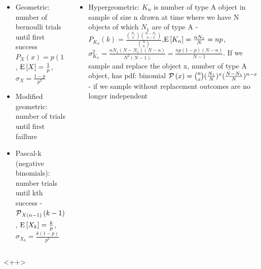 \documentclass[asd-beamer.tex]{subfiles}%
\begin{document}
\begin{frame}{}
    \begin{columns}[T]
        \begin{column}{0.5\textwidth}
            \begin{itemize}
                \item Geometric: number of bernoulli trials until first success $P_X(x)=p(1-p)^{x-1}$, $\operatorname{E}{[X]}=\frac{1}{p}$, $\sigma_X=\frac{1-p}{p^2}$
                \item Modified geometric: number of trials until first faillure
                \item Pascal-k (negative binomials): number trials until kth success - $\operatorname{\mathcal{P}}_{X(n-1)}{(k-1)}=\binom{n-1}(k-1)p^{k-1}(1-p)^{n-k}$, $\operatorname{E}{[X_k]}=\frac{k}{p}$, $\sigma_{X_k}=\frac{k(1-p)}{p^2}$
            \end{itemize}
        \end{column}
        \begin{column}{0.5\textwidth}
            \begin{itemize}
                \item Hypergeometric: $K_n$ is number of type A object in sample of size n drawn at time where we have N objects of which $N_1$ are of type A - $P_{K_n}(k)=\frac{\binom{N_1}{k}\binom{N-N_1}{n-k}}{\binom{N}{n}}$,$\operatorname{E}{[K_n]}=\frac{nN_1}{N}=np$, $\sigma_{K_n}^2=\frac{nN_1(N-N_1)(N-n)}{N^2(N-1)}=\frac{np(1-p)(N-n)}{N-1}$. If we sample and replace the object x, number of type A object, has pdf: binomial $\operatorname{\mathcal{P}}{(x)}=\binom{n}{x}(\frac{N_1}{N})^x(\frac{N-N_1}{N})^{n-x}$ - if we sample without replacement outcomes are no longer independent
            \end{itemize}
        \end{column}
    \end{columns}
    <++>
\end{frame}
\end{document}
